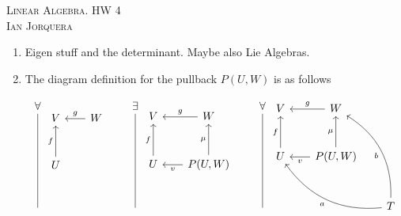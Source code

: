 \documentclass[12pt]{amsart}
\theoremstyle{definition}
\begin{document}
\begin{center}
    \textsc{Linear Algebra. HW 4\\ Ian Jorquera}
\end{center}
\vspace{1em}

\begin{enumerate}[start=0]
    \item Eigen stuff and the determinant. Maybe also Lie Algebras.\\

    \item The diagram definition for the pullback $P(U,W)$ is as follows

    \[
    \begin{tikzcd}[row sep=1cm, column sep=.7cm]
     \forall\arrow[ddd, dash]\\
     \\
     \\
     \;
    \end{tikzcd} 
    \begin{tikzcd}[row sep=1cm, column sep=.65cm]
     V& W\arrow[l,"g"']\\
     U\arrow[u, "f"]&\\
     & & 
    \end{tikzcd}
    \begin{tikzcd}[row sep=1cm, column sep=.7cm]
     \exists\arrow[ddd, dash]\\
     \\
     \\
     \;
    \end{tikzcd} 
    \begin{tikzcd}[row sep=1cm, column sep=.65cm]
     V& W\arrow[l,"g"']\\
     U\arrow[u, "f"]& P(U,W)\arrow[u, "\mu"]\arrow[l, "v"]\\
     & & 
    \end{tikzcd}
    \begin{tikzcd}[row sep=1cm, column sep=.7cm]
     \forall\arrow[ddd, dash,]\\
     \\
     \\
     \;
    \end{tikzcd}
    \begin{tikzcd}[row sep=1cm, column sep=.65cm]
     V& W\arrow[l,"g"']\\
     U\arrow[u, "f"]& P(U,W)\arrow[u, "\mu"]\arrow[l, "v"]\\
     & & T\arrow[ull, "a", bend left]\arrow[uul, "b", bend right]

\end{tikzcd}\]
\end{enumerate}
\end{document}
